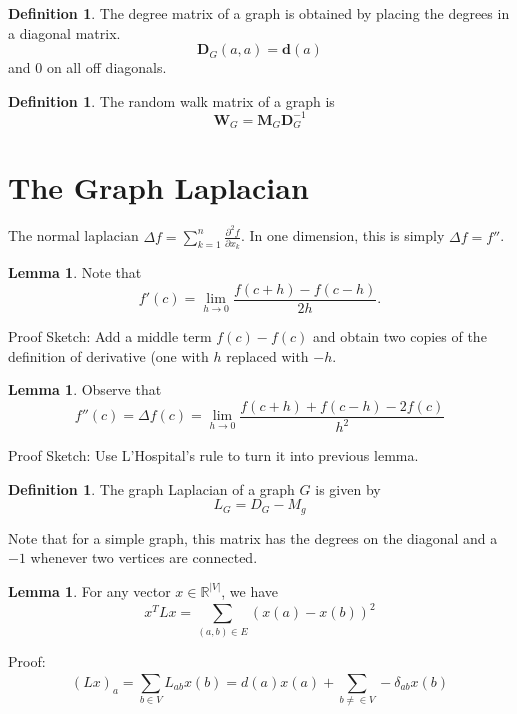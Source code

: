 \documentclass[12pt]{article}
\theoremstyle{definition}
\newtheorem{lem}[thm]{Lemma}
\newtheorem{defn}[thm]{Definition}
\def\R{{\mathbb R}}
\newcommand{\ds}{\displaystyle}
\begin{document}
\begin{defn}
The degree matrix of a graph is obtained by placing the degrees in a diagonal matrix.
$$ \mathbf{D}_G(a,a) = \mathbf{d}(a) $$ 
and 0 on all off diagonals.
\end{defn}

\begin{defn}
The random walk matrix of a graph is 
$$ \mathbf{W}_G = \mathbf{M}_G \mathbf{D}_G^{-1} $$ 
\end{defn}

\section*{The Graph Laplacian}
The normal laplacian $\ds \Delta f = \sum_{k=1}^{n} \frac{\partial^2 f}{\partial x_k}  $. In one dimension, this is simply $ \Delta f = f'' $.
\begin{lem}
Note that 
$$ f'(c)= \lim_{h\to 0} \frac{f(c+h)-f(c-h)}{2h}. $$ 
\end{lem}

Proof Sketch: Add a middle term $ f(c)-f(c) $ and obtain two copies of the definition of derivative (one with $ h $ replaced with $ -h $.

\begin{lem}
Observe that 
$$ f''(c)=\Delta f(c)= \lim_{h\to 0} \frac{f(c+h)+f(c-h)-2f(c)}{h^2} $$ 
\end{lem}

Proof Sketch: Use L'Hospital's rule to turn it into previous lemma.

\begin{defn}
The graph Laplacian of a graph $ G $ is given by
$$ L_G =D_G-M_g $$ 
\end{defn}
Note that for a simple graph, this matrix has the degrees on the diagonal and a $ -1 $ whenever two vertices are connected.

\begin{lem}
    For any vector $ x\in \R^{|V|}$, we have
    $$ x^TLx = \sum_{(a,b)\in E}^{}(x(a)-x(b))^2  $$ 
\end{lem}
Proof:
$$ (Lx)_a= \sum_{b\in V}^{} L_{ab}x(b) =d(a)x(a)+\sum_{b\neq \in V}^{} -\delta_{ab}x(b)    $$ 
\end{document}
